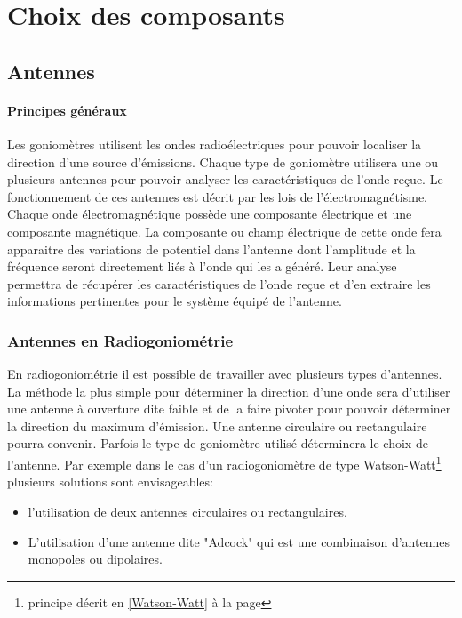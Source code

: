 \chapter{Choix des composants}


\section{Antennes}

\subsubsection{Principes généraux}

	Les goniomètres utilisent les ondes radioélectriques pour pouvoir localiser la direction d'une source d'émissions. Chaque type de goniomètre utilisera une ou plusieurs antennes pour pouvoir analyser les caractéristiques de l'onde reçue. 
	Le fonctionnement de ces antennes est décrit par les lois de l'électromagnétisme. Chaque onde électromagnétique possède une composante électrique et une composante magnétique. La composante ou champ électrique de cette onde fera apparaitre des variations de potentiel dans l'antenne dont l'amplitude et la fréquence seront directement liés à l'onde qui les a généré. Leur analyse permettra de récupérer les caractéristiques de l'onde reçue et d'en extraire les informations pertinentes pour le système équipé de l'antenne.
	
\subsection{Antennes en Radiogoniométrie}

En radiogoniométrie il est possible de travailler avec plusieurs types d'antennes. La méthode la plus simple pour déterminer la direction d'une onde sera d'utiliser une antenne à ouverture dite faible et de la faire pivoter pour pouvoir déterminer la direction du maximum d'émission. Une antenne circulaire ou rectangulaire pourra convenir. Parfois le type de goniomètre utilisé déterminera le choix de l'antenne. Par exemple dans le cas d'un radiogoniomètre de type Watson-Watt\footnote{principe décrit en \ref{Watson-Watt} à la page \pageref{Watson-Watt}} plusieurs solutions sont envisageables: 
	
\begin{itemize}

\item l'utilisation de deux antennes circulaires ou rectangulaires.

\item L'utilisation d'une antenne dite "Adcock" qui est une combinaison d'antennes monopoles ou dipolaires. 

\end{itemize} 


